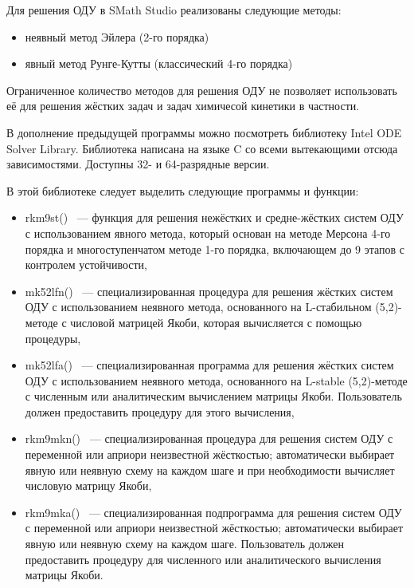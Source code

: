 Для решения ОДУ в SMath Studio реализованы следующие методы:

\begin{itemize}
    \item неявный метод Эйлера (2-го порядка)
    \item явный метод Рунге-Кутты (классический 4-го порядка)
\end{itemize}

Ограниченное количество методов для решения ОДУ не позволяет использовать её для решения жёстких задач и задач химичесой кинетики
в частности.

В дополнение предыдущей программы можно посмотреть библиотеку Intel ODE Solver Library.
Библиотека написана на языке C со всеми вытекающими отсюда зависимостями. Доступны 32- и 64-разрядные версии.

В этой библиотеке следует выделить следующие программы и функции:
\begin{itemize}
    \item rkm9st() ~--- функция для решения нежёстких и средне-жёстких систем ОДУ с использованием явного метода, который основан на
        методе Мерсона 4-го порядка и многоступенчатом методе 1-го порядка, включающем до 9 этапов с контролем устойчивости,
    \item mk52lfn() ~--- специализированная процедура для решения жёстких систем ОДУ с использованием неявного метода, основанного
        на L-стабильном (5,2)-методе с числовой матрицей Якоби, которая вычисляется с помощью процедуры,
    \item mk52lfa() ~--- специализированная программа для решения жёстких систем ОДУ с использованием неявного метода, основанного на
        L-stable (5,2)-методе с численным или аналитическим вычислением матрицы Якоби. Пользователь должен предоставить процедуру для
        этого вычисления,
    \item rkm9mkn() ~--- специализированная процедура для решения систем ОДУ с переменной или априори неизвестной жёсткостью;
        автоматически выбирает явную или неявную схему на каждом шаге и при необходимости вычисляет числовую матрицу Якоби,
    \item rkm9mka() ~--- специализированная подпрограмма для решения систем ОДУ с переменной или априори неизвестной жёсткостью;
        автоматически выбирает явную или неявную схему на каждом шаге. Пользователь должен предоставить процедуру для численного или
        аналитического вычисления матрицы Якоби.
\end{itemize}

